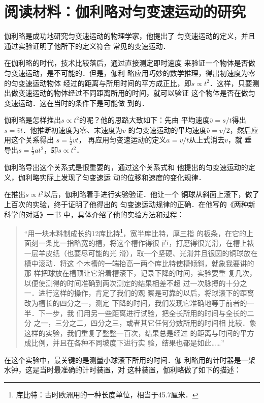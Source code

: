 \section*{阅读材料：伽利略对匀变速运动的研究}
   伽利略是成功地研究匀变速运动的物理学家，他提出了
匀变速运动的定义，并且通过实验证明了他所下的定义符合
常见的变速运动．

    在伽利略的时代，技术比较落后，通过直接测定即时速度
来验证一个物体是否做匀变速运动，是不可能的．但是，伽利
略应用巧妙的数学推理，得出初速度为零的匀变速运动物体
经过的距离与所用时间的平方成正比，即$s\propto t^2$．这样，只要测
出做变速运动的物体经过不同距离所用的时间，就可以验证
这个物体是否在做匀变速运动．这在当时的条件下是可能做
到的．

    伽利略是怎样推出$s\propto t^2$的呢？他的思路大致如下：先由
平均速度$\bar v=s/t$得出$s=\bar v t$．他推断初速度为零、末速度为$v$
的匀变速运动的平均速度$\bar v=v/2$，然后应用这个关系得出
$s=\frac{1}{2} v t$，
再应用匀变速运动的定义$a=v/t$从上式消去$v$，就                                                                       垂
导出$s=\frac{1}{2} a t^2$，即$s\propto t^2$．

  伽利略导出这个关系式是很重要的，通过这个关系式和
他提出的匀变速运动的定义，伽利略实际上发现了匀变速运
动的位移和速度的变化规律．

    在推出$s\propto t^2$以后，伽利略着手进行实验验证．他让一个
铜球从斜面上滚下，做了上百次的实验，终于证明了他得出的
匀变速运动规律的正确．在他写的《两种新科学的对话》一书
中，具体介绍了他的实验方法和过程：

\begin{quotation}
    “用一块木料制成长约12库比持\footnote{库比特：古时欧洲用的一种长度单位，相当于45.7厘米．
}，宽半库比特，厚三指
的板条，在它的上面刻一条比一指略宽的槽，将这个槽作得很
直，打磨得很光滑，在槽上裱一层羊皮纸（也要尽可能的光
滑），取一个坚硬、光滑并且很圆的铜球放在槽中滚动．将这
个木槽的一端抬高一两个库比特使槽倾斜，就象我要讲的那
样把球放在槽顶让它沿着槽滚下，记录下降的时间，实验要重
复几次，以便使测得的时间准确到两次测定的结果相差不超
过一次脉搏的十分之一．进行这样的操作，肯定了我们的观
察是可靠的以后，将球滚下的距离改为槽长的四分之一，测定
下降的时间，我们发现它准确地等于前者的一半．下一步，我
们用另一些距离进行试验，把全长所用的时间与全长的二分
之一，三分之二，四分之三，或者其它任何分数所用的时间相
比较．象这样的实验，我们重复了整整一百次，结果总是经过
的距离与时间的平方成比例，并且在各种不同坡度下进行实
验，结果也都是如此……”
\end{quotation}

    在这个实验中，最关键的是测量小球滚下所用的时间．伽
利略用的计时器是一架水钟，这是当时最准确的计时装置，对
这种装置，伽利略做了如下的描述：

